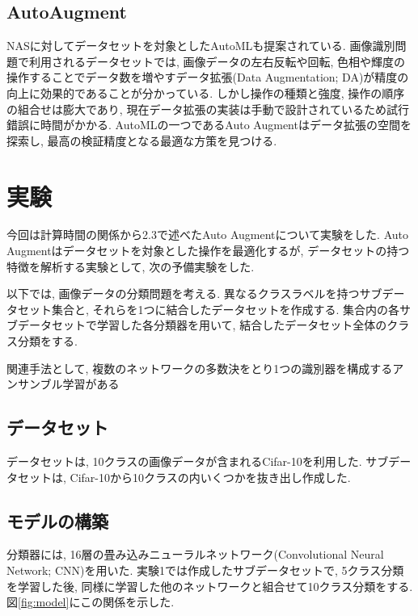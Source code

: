 \documentclass[twocolumn]{jarticle}     %
\begin{document}
\subsection{AutoAugment}

NASに対してデータセットを対象としたAutoMLも提案されている.
画像識別問題で利用されるデータセットでは, 画像データの左右反転や回転, 色相や輝度の操作することでデータ数を増やすデータ拡張(Data Augmentation; DA)が精度の向上に効果的であることが分かっている.
しかし操作の種類と強度, 操作の順序の組合せは膨大であり, 現在データ拡張の実装は手動で設計されているため試行錯誤に時間がかかる.
AutoMLの一つであるAuto Augment\cite{DBLP:journals/corr/abs-1805-09501}はデータ拡張の空間を探索し, 最高の検証精度となる最適な方策を見つける.

\section{実験}
今回は計算時間の関係から2.3で述べたAuto Augmentについて実験をした.
Auto Augmentはデータセットを対象とした操作を最適化するが,
データセットの持つ特徴を解析する実験として, 次の予備実験をした.

以下では, 画像データの分類問題を考える.
異なるクラスラベルを持つサブデータセット集合と, それらを1つに結合したデータセットを作成する.
集合内の各サブデータセットで学習した各分類器を用いて, 結合したデータセット全体のクラス分類をする.

関連手法として, 複数のネットワークの多数決をとり1つの識別器を構成するアンサンブル学習がある

\subsection{データセット}
データセットは, 10クラスの画像データが含まれるCifar-10\cite{cifar10}を利用した.
サブデータセットは, Cifar-10から10クラスの内いくつかを抜き出し作成した.

\subsection{モデルの構築}
分類器には, 16層の畳み込みニューラルネットワーク(Convolutional Neural Network; CNN)を用いた.
実験1では作成したサブデータセットで, 5クラス分類を学習した後, 同様に学習した他のネットワークと組合せて10クラス分類をする. 図\ref{fig:model}にこの関係を示した.
\end{document}
